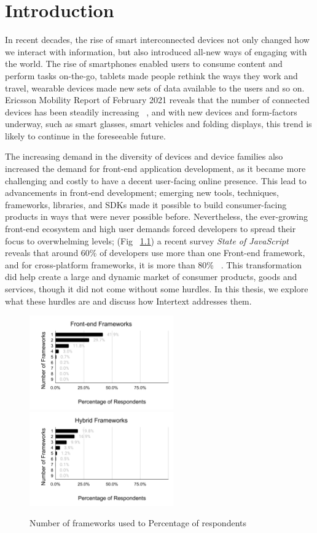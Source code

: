 
\chapter{Introduction}

In recent decades, the rise of smart interconnected devices not only changed how we interact with information, but also introduced all-new ways of engaging with the world. The rise of smartphones enabled users to consume content and perform tasks on-the-go, tablets made people rethink the ways they work and travel, wearable devices made new sets of data available to the users and so on. Ericsson Mobility Report of February 2021 reveals that the number of connected devices has been steadily increasing ~\cite{EricssonMobility2020}, and with new devices and form-factors underway, such as smart glasses, smart vehicles and folding displays, this trend is likely to continue in the foreseeable future. 

The increasing demand in the diversity of devices and device families also increased the demand for front-end application development, as it became more challenging and costly to have a decent user-facing online presence. This lead to advancements in front-end development; emerging new tools, techniques, frameworks, libraries, and SDKs made it possible to build consumer-facing products in ways that were never possible before. Nevertheless, the ever-growing front-end ecosystem and high user demands forced developers to spread their focus to overwhelming levels; (Fig ~\ref{fig:num_of_frameworks_used}) a recent survey \textit{State of JavaScript} reveals that around 60\% of developers use more than one Front-end framework, and for cross-platform frameworks, it is more than 80\% ~\cite{StateOfJs2020}. This transformation did help create a large and dynamic market of consumer products, goods and services, though it did not come without some hurdles. In this thesis, we explore what these hurdles are and discuss how Intertext addresses them.

\begin{figure}
  \centering
  \includegraphics[width=6.2cm]{images/sojs1.pdf}
  \,
  \includegraphics[width=6.2cm]{images/sojs2.pdf}
  \caption{Number of frameworks used to Percentage of respondents}%
  \label{fig:num_of_frameworks_used}%
\end{figure}





